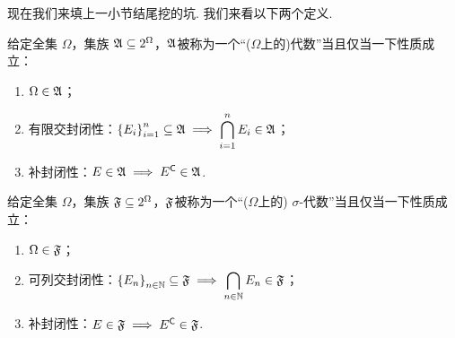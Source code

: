 现在我们来填上一小节结尾挖的坑. 我们来看以下两个定义.

\begin{definition}[代数]
    给定全集 $\Omega$，集族 ${\mathfrak{A}}\subseteq2^{\Omega}$，${\mathfrak{A}}$被称为一个“($\Omega$上的)代数”当且仅当一下性质成立：
    \begin{enumerate}
        \item $\Omega\in{\mathfrak{A}}$；
        \item 有限交封闭性：$\displaystyle \left\{ E_i \right\}_{i=1}^n\subseteq{\mathfrak{A}}\implies \bigcap_{i=1}^n E_i \in{\mathfrak{A}}$；
        \item 补封闭性：$E\in{\mathfrak{A}}\implies E^{\mathsf{C}}\in{\mathfrak{A}}$.
    \end{enumerate}
\end{definition}

\begin{definition}[$\sigma$-代数]
    给定全集 $\Omega$，集族 ${\mathfrak{F}}\subseteq2^{\Omega}$，${\mathfrak{F}}$被称为一个“($\Omega$上的) $\sigma$-代数”当且仅当一下性质成立：
    \begin{enumerate}
        \item $\Omega\in{\mathfrak{F}}$；
        \item 可列交封闭性：$\displaystyle \left\{ E_n \right\}_{n\in\mathbb{N}}\subseteq{\mathfrak{F}}\implies \bigcap_{n\in\mathbb{N}} E_n \in{\mathfrak{F}}$；
        \item 补封闭性：$E\in{\mathfrak{F}}\implies E^{\mathsf{C}}\in{\mathfrak{F}}$.
    \end{enumerate}
\end{definition}

